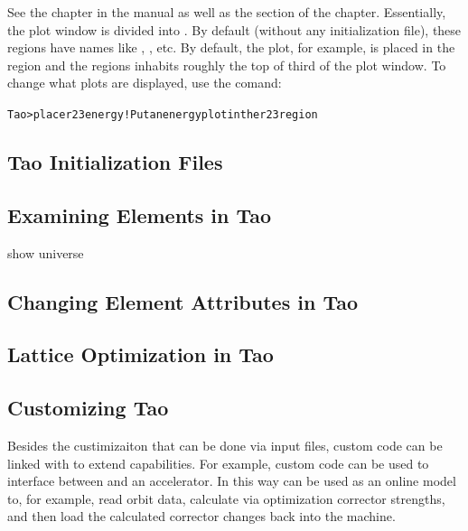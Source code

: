 \documentclass{hitec}
\begin{document}
See the  chapter in the \tao manual as well as the  section of the  chapter. Essentially, the plot window is
divided into . By default (without any initialization file), these regions
have names like , , etc. By default, the  plot, for example, is
placed in the  region and the  regions inhabits roughly the top of third
of the plot window. To change what plots are displayed, use the  comand:
\begin{alltt}
  Tao> place r23 energy  ! Put an energy plot in the r23 region
\end{alltt}

\subsection{Tao Initialization Files}



\subsection{Examining Elements in Tao}

show universe

\subsection{Changing Element Attributes in Tao}

\subsection{Lattice Optimization in Tao}


\subsection{Customizing Tao}

Besides the custimizaiton that can be done via \tao input files, \tao custom code
can be linked with \tao to extend \tao capabilities. For example, custom code can
be used to interface between \tao and an accelerator. In this way \tao can be used
as an online model to, for example, read orbit data, calculate via optimization corrector
strengths, and then load the calculated corrector changes back into the machine.
\end{document}
